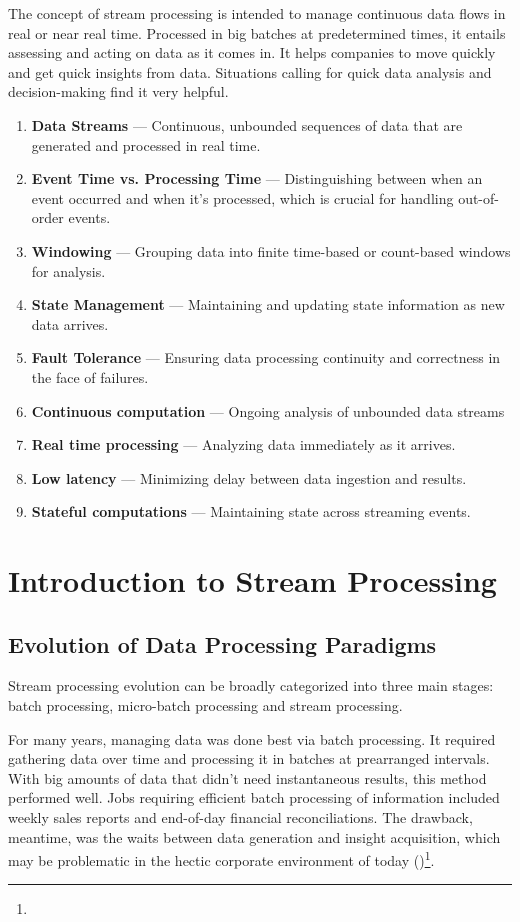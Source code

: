 The concept of stream processing is intended to manage continuous data flows in real or near real time. Processed in big batches at predetermined times, it entails assessing and acting on data as it comes in. It helps companies to move quickly and get quick insights from data. Situations calling for quick data analysis and decision-making find it very helpful.

\begin{enumerate}
    \item \textbf{Data Streams} — Continuous, unbounded sequences of data that are generated and processed in real time.
    \item \textbf{Event Time vs. Processing Time} — Distinguishing between when an event occurred and when it's processed, which is crucial for handling out-of-order events. 
    \item \textbf{Windowing} — Grouping data into finite time-based or count-based windows for analysis. 
    \item \textbf{State Management} — Maintaining and updating state information as new data arrives. 
    \item \textbf{Fault Tolerance} — Ensuring data processing continuity and correctness in the face of failures.
    \item \textbf{Continuous computation} — Ongoing analysis of unbounded data streams
    \item \textbf{Real time processing} — Analyzing data immediately as it arrives.
    \item \textbf{Low latency} — Minimizing delay between data ingestion and results.
    \item \textbf{Stateful computations} — Maintaining state across streaming events.
\end{enumerate}

\section{Introduction to Stream Processing}

\subsection{Evolution of Data Processing Paradigms}

Stream processing evolution can be broadly categorized into three main stages: batch processing, micro-batch processing and stream processing.

For many years, managing data was done best via batch processing. It required gathering data over time and processing it in batches at prearranged intervals. With big amounts of data that didn't need instantaneous results, this method performed well. Jobs requiring efficient batch processing of information included weekly sales reports and end-of-day financial reconciliations. The drawback, meantime, was the waits between data generation and insight acquisition, which may be problematic in the hectic corporate environment of today (\cite{Akidau2015TheDM})\footnote[36]{}.

